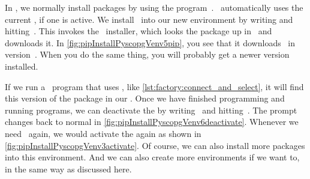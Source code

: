 In \python, we normally install packages by using the program~\pip.
\pip~automatically uses the current , if one is active.
We install \psycopg\ into our new environment by writing  and hitting~\keys{\return}.
This invokes the \pip\ installer, which looks the package up in \pypi\ and downloads it.
In \cref{fig:pipInstallPyscopgVenv5pip}, you see that it downloads \psycopg\ in version~.
When you do the same thing, you will probably get a newer version installed.

If we run a \python\ program that uses \psycopg, like \cref{lst:factory:connect_and_select}, it will find this version of the package in our .
Once we have finished programming and running programs, we can deactivate the  by writing~ and hitting~\keys{\return}.
The prompt changes back to normal in \cref{fig:pipInstallPyscopgVenv6deactivate}.
Whenever we need \psycopg\ again, we would activate the  again as shown in \cref{fig:pipInstallPyscopgVenv3activate}.
Of course, we can also install more packages into this environment.
And we can also create more environments if we want to, in the same way as discussed here.%
\FloatBarrier%
\endhsection%
%
%
\label{sec:cloningExamplesRepoAndInstallingPsycopgUnderPyCharm}%
%
